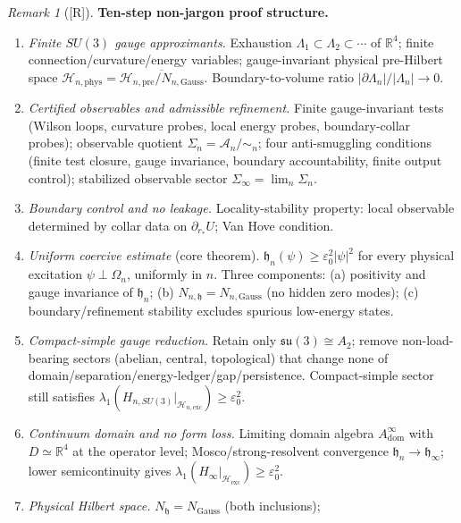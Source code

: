 \documentclass[12pt,oneside]{amsbook}
\theoremstyle{plain}
\theoremstyle{definition}
\theoremstyle{remark}
\newtheorem{remark}[theorem]{Remark}
\newcommand{\status}[1]{\textup{[#1]}}
\begin{document}
\begin{remark}[\status{R}]\label{rem:nonjargon-architecture}
\textbf{Ten-step non-jargon proof structure.}
\begin{enumerate}[label=\textup{(\arabic*)}]
 \item \emph{Finite $SU(3)$ gauge approximants.}
 Exhaustion $\Lambda_1\subset\Lambda_2\subset\cdots$ of
 $\mathbb{R}^4$; finite connection/curvature/energy variables;
 gauge-invariant physical pre-Hilbert space
 $\mathcal{H}_{n,\mathrm{phys}}=\overline{\mathcal{H}_{n,\mathrm{pre}}/N_{n,\mathrm{Gauss}}}$.
 Boundary-to-volume ratio $|\partial\Lambda_n|/|\Lambda_n|\to0$.
 \item \emph{Certified observables and admissible refinement.}
 Finite gauge-invariant tests (Wilson loops, curvature probes, local energy probes,
 boundary-collar probes); observable quotient
 $\Sigma_n=\mathcal{A}_n/{\sim_n}$;
 four anti-smuggling conditions (finite test closure, gauge invariance,
 boundary accountability, finite output control); stabilized observable sector
 $\Sigma_\infty=\lim_n\Sigma_n$.
 \item \emph{Boundary control and no leakage.}
 Locality-stability property: local observable determined by
 collar data on $\partial_{r_*}U$; Van Hove condition.
 \item \emph{Uniform coercive estimate} (core theorem).
 $\mathfrak{h}_n(\psi)\ge\varepsilon_0^2|\psi|^2$ for every
 physical excitation $\psi\perp\Omega_n$, uniformly in $n$.
 Three components: (a) positivity and gauge invariance of
 $\mathfrak{h}_n$; (b) $N_{n,\mathfrak{h}}=N_{n,\mathrm{Gauss}}$
 (no hidden zero modes); (c) boundary/refinement stability
 excludes spurious low-energy states.
 \item \emph{Compact-simple gauge reduction.}
 Retain only $\mathfrak{su}(3)\cong A_2$; remove non-load-bearing
 sectors (abelian, central, topological) that change none of
 domain/separation/energy-ledger/gap/persistence.
 Compact-simple sector still satisfies
 $\lambda_1(H_{n,SU(3)}|_{\mathcal{H}_{n,\mathrm{exc}}})\ge\varepsilon_0^2$.
 \item \emph{Continuum domain and no form loss.}
 Limiting domain algebra $A^\infty_{\mathrm{dom}}$ with
 $D\simeq\mathbb{R}^4$ at the operator level;
 Mosco/strong-resolvent convergence $\mathfrak{h}_n\to\mathfrak{h}_\infty$;
 lower semicontinuity gives
 $\lambda_1(H_\infty|_{\mathcal{H}_{\mathrm{exc}}})\ge\varepsilon_0^2$.
 \item \emph{Physical Hilbert space.}
 $N_{\mathfrak{h}}=N_{\mathrm{Gauss}}$ (both inclusions);

\end{enumerate}
\end{remark}
\end{document}
